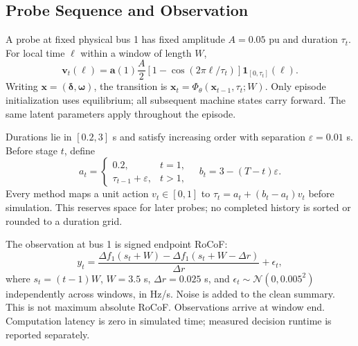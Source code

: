 \documentclass[conference]{IEEEtran}
\begin{document}
\subsection{Probe Sequence and Observation}
A probe at fixed physical bus 1 has fixed amplitude $A=0.05$ pu and duration
$\tau_t$. For local time $\ell$ within a window of length $W$,
\begin{equation}
\mathbf v_t(\ell)=\mathbf a(1)\frac{A}{2}
 [1-\cos(2\pi\ell/\tau_t)]\mathbf1_{[0,\tau_t]}(\ell).
\end{equation}
Writing $\mathbf x=(\boldsymbol\delta,\boldsymbol\omega)$, the transition is
$\mathbf x_t=\Phi_\theta(\mathbf x_{t-1},\tau_t;W)$.
Only episode initialization uses equilibrium; all subsequent machine states
carry forward. The same latent parameters apply throughout the episode.

Durations lie in $[0.2,3]$ s and satisfy increasing order with separation
$\varepsilon=0.01$ s. Before stage $t$, define
\begin{equation}
a_t=\begin{cases}0.2,&t=1,\\\tau_{t-1}+\varepsilon,&t>1,\end{cases}
\quad b_t=3-(T-t)\varepsilon.
\end{equation}
Every method maps a unit action $v_t\in[0,1]$ to
$\tau_t=a_t+(b_t-a_t)v_t$ before simulation. This reserves space for later
probes; no completed history is sorted or rounded to a duration grid.

The observation at bus 1 is signed endpoint RoCoF:
\begin{equation}
y_t=\frac{\Delta f_1(s_t+W)-\Delta f_1(s_t+W-\Delta r)}{\Delta r}
 +\epsilon_t,
\label{eq:sensor}
\end{equation}
where $s_t=(t-1)W$, $W=3.5$ s, $\Delta r=0.025$ s, and
$\epsilon_t\sim\mathcal N(0,0.005^2)$ independently across windows, in
Hz/s. Noise is added to the clean summary. This is not maximum absolute
RoCoF. Observations arrive at window end. Computation latency is zero in
simulated time; measured decision runtime is reported separately.
\end{document}
